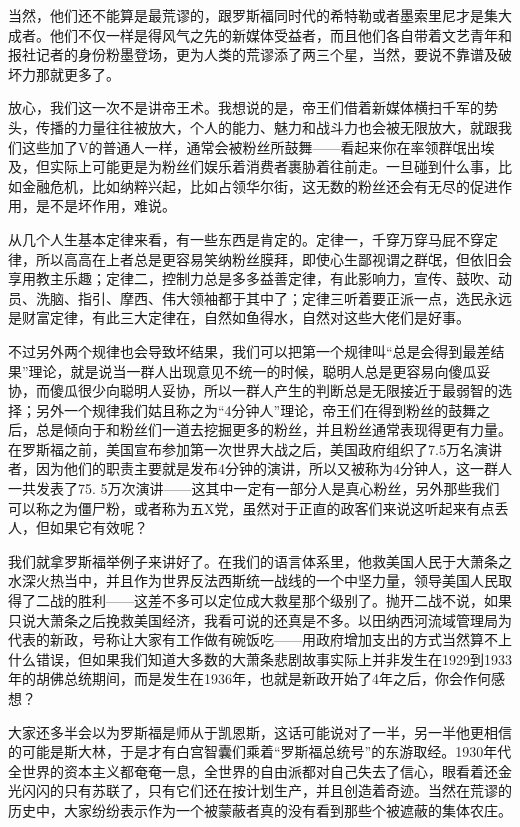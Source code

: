 当然，他们还不能算是最荒谬的，跟罗斯福同时代的希特勒或者墨索里尼才是集大成者。他们不仅一样是得风气之先的新媒体受益者，而且他们各自带着文艺青年和报社记者的身份粉墨登场，更为人类的荒谬添了两三个星，当然，要说不靠谱及破坏力那就更多了。

放心，我们这一次不是讲帝王术。我想说的是，帝王们借着新媒体横扫千军的势头，传播的力量往往被放大，个人的能力、魅力和战斗力也会被无限放大，就跟我们这些加了V的普通人一样，通常会被粉丝所鼓舞------看起来你在率领群氓出埃及，但实际上可能更是为粉丝们娱乐着消费者裹胁着往前走。一旦碰到什么事，比如金融危机，比如纳粹兴起，比如占领华尔街，这无数的粉丝还会有无尽的促进作用，是不是坏作用，难说。

从几个人生基本定律来看，有一些东西是肯定的。定律一，千穿万穿马屁不穿定律，所以高高在上者总是更容易笑纳粉丝膜拜，即使心生鄙视谓之群氓，但依旧会享用教主乐趣；定律二，控制力总是多多益善定律，有此影响力，宣传、鼓吹、动员、洗脑、指引、摩西、伟大领袖都于其中了；定律三听着要正派一点，选民永远是财富定律，有此三大定律在，自然如鱼得水，自然对这些大佬们是好事。

不过另外两个规律也会导致坏结果，我们可以把第一个规律叫``总是会得到最差结果''理论，就是说当一群人出现意见不统一的时候，聪明人总是更容易向傻瓜妥协，而傻瓜很少向聪明人妥协，所以一群人产生的判断总是无限接近于最弱智的选择；另外一个规律我们姑且称之为``4分钟人''理论，帝王们在得到粉丝的鼓舞之后，总是倾向于和粉丝们一道去挖掘更多的粉丝，并且粉丝通常表现得更有力量。在罗斯福之前，美国宣布参加第一次世界大战之后，美国政府组织了7.5万名演讲者，因为他们的职责主要就是发布4分钟的演讲，所以又被称为4分钟人，这一群人一共发表了75.
5万次演讲------这其中一定有一部分人是真心粉丝，另外那些我们可以称之为僵尸粉，或者称为五X党，虽然对于正直的政客们来说这听起来有点丢人，但如果它有效呢？

我们就拿罗斯福举例子来讲好了。在我们的语言体系里，他救美国人民于大萧条之水深火热当中，并且作为世界反法西斯统一战线的一个中坚力量，领导美国人民取得了二战的胜利------这差不多可以定位成大救星那个级别了。抛开二战不说，如果只说大萧条之后挽救美国经济，我看可说的还真是不多。以田纳西河流域管理局为代表的新政，号称让大家有工作做有碗饭吃------用政府增加支出的方式当然算不上什么错误，但如果我们知道大多数的大萧条悲剧故事实际上并非发生在1929到1933年的胡佛总统期间，而是发生在1936年，也就是新政开始了4年之后，你会作何感想？

大家还多半会以为罗斯福是师从于凯恩斯，这话可能说对了一半，另一半他更相信的可能是斯大林，于是才有白宫智囊们乘着``罗斯福总统号''的东游取经。1930年代全世界的资本主义都奄奄一息，全世界的自由派都对自己失去了信心，眼看着还金光闪闪的只有苏联了，只有它们还在按计划生产，并且创造着奇迹。当然在荒谬的历史中，大家纷纷表示作为一个被蒙蔽者真的没有看到那些个被遮蔽的集体农庄。

